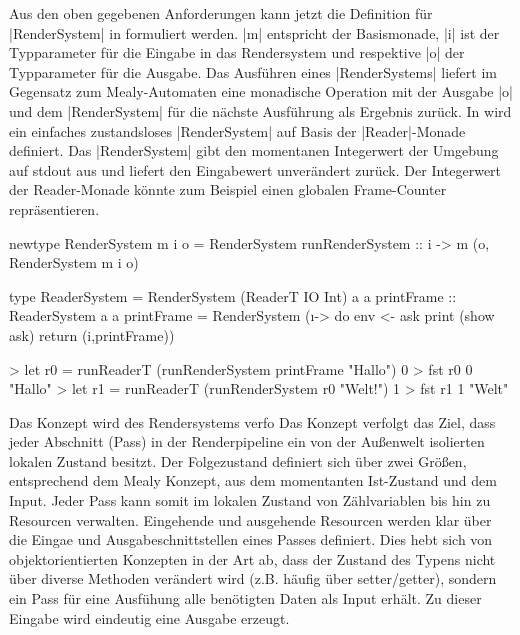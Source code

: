 Aus den oben gegebenen Anforderungen kann jetzt die Definition für |RenderSystem| in  formuliert werden. |m| entspricht der Basismonade, |i| ist der Typparameter für die Eingabe in das Rendersystem und respektive |o| der Typparameter für die Ausgabe. Das Ausführen eines |RenderSystems| liefert im Gegensatz zum Mealy-Automaten eine monadische Operation mit der Ausgabe |o| und dem |RenderSystem| für die nächste Ausführung als Ergebnis zurück. In  wird ein einfaches zustandsloses |RenderSystem| auf Basis der |Reader|-Monade definiert. Das |RenderSystem| gibt den momentanen Integerwert der Umgebung auf stdout aus und liefert den Eingabewert unverändert zurück. Der Integerwert der Reader-Monade könnte zum Beispiel einen globalen Frame-Counter repräsentieren.

\begin{haskell}[label={lst:definition-rendersystem},caption={Definition Rendersystem}]
newtype RenderSystem m i o = RenderSystem { runRenderSystem :: i -> m (o, RenderSystem m i o) }
\end{haskell}

\begin{haskell}[label={lst:rendersystem-beispiel-reader},caption={Rendersystem mit ReaderT IO als Basismonade}]
type ReaderSystem = RenderSystem (ReaderT IO Int) a a
printFrame :: ReaderSystem a a
printFrame = RenderSystem (\i -> do
	env <- ask 
	print (show ask)
	return (i,printFrame))
\end{haskell}

\begin{haskell}[label={lst:rendersystem-ausfuehrung-beispiel},caption={Ausführungsbeispiel Rendersystem}]
> let r0 = runReaderT (runRenderSystem printFrame "Hallo") 0
> fst r0
0
"Hallo"
> let r1 = runReaderT (runRenderSystem r0 "Welt!") 1
> fst r1
1
"Welt"
\end{haskell}

Das Konzept wird des Rendersystems verfo
Das Konzept verfolgt das Ziel, dass jeder Abschnitt (Pass) in der Renderpipeline ein von der Außenwelt isolierten lokalen Zustand besitzt. Der Folgezustand definiert sich über zwei Größen, entsprechend dem Mealy Konzept, aus dem momentanten Ist-Zustand und dem Input. Jeder Pass kann somit im lokalen Zustand von Zählvariablen bis hin zu Resourcen verwalten. Eingehende und ausgehende Resourcen werden klar über die Eingae und Ausgabeschnittstellen eines Passes definiert. Dies hebt sich von objektorientierten Konzepten in der Art ab, dass der Zustand des Typens nicht über diverse Methoden verändert wird (z.B. häufig über setter/getter), sondern ein Pass für eine Ausfühung alle benötigten Daten als Input erhält. Zu dieser Eingabe wird eindeutig eine Ausgabe erzeugt.

